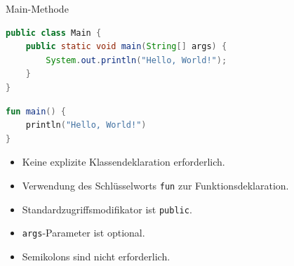 \documentclass{beamer}
\begin{document}
\begin{frame}[fragile]{Main-Methode}
  \begin{lstlisting}[language=Java, title=Java Main-Methode, xleftmargin=1em]
public class Main {
    public static void main(String[] args) {
        System.out.println("Hello, World!");
    }
}
  \end{lstlisting}
  \pause\vspace{0cm}
  \begin{lstlisting}[language=Kotlin, title=Kotlin Main-Methode, xleftmargin=1em]
fun main() {
    println("Hello, World!")
}
  \end{lstlisting}
    \pause\vspace{0cm}
    \begin{itemize}
      \item Keine explizite Klassendeklaration erforderlich. %
      \item Verwendung des Schlüsselworts \texttt{fun} zur Funktionsdeklaration.
      \item Standardzugriffsmodifikator ist \texttt{public}.
      \item \texttt{args}-Parameter ist optional.
      \item Semikolons sind nicht erforderlich.
    \end{itemize}
    \vspace{1cm}
\end{frame}
\end{document}
